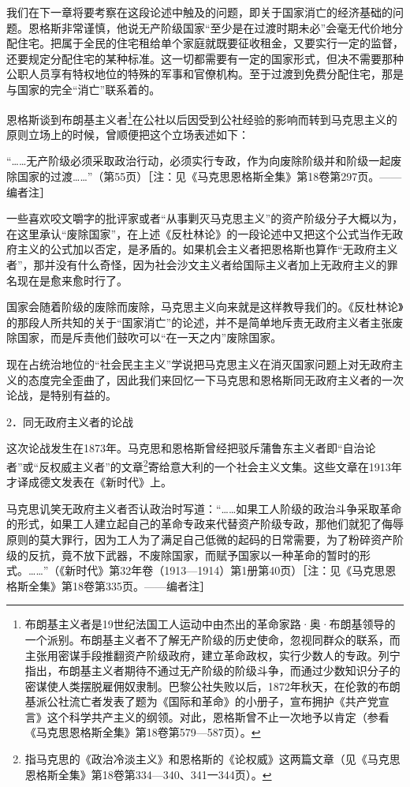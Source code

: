 \documentclass[UTF8, 12pt, a4paper]{ctexrep}
\begin{document}
我们在下一章将要考察在这段论述中触及的问题，即关于国家消亡的经济基础的问题。恩格斯非常谨慎，他说无产阶级国家“至少是在过渡时期未必”会毫无代价地分配住宅。把属于全民的住宅租给单个家庭就既要征收租金，又要实行一定的监督，还要规定分配住宅的某种标准。这一切都需要有一定的国家形式，但决不需要那种公职人员享有特权地位的特殊的军事和官僚机构。至于过渡到免费分配住宅，那是与国家的完全“消亡”联系着的。

恩格斯谈到布朗基主义者\footnote{布朗基主义者是19世纪法国工人运动中由杰出的革命家路·奥·布朗基领导的一个派别。布朗基主义者不了解无产阶级的历史使命，忽视同群众的联系，而主张用密谋手段推翻资产阶级政府，建立革命政权，实行少数人的专政。列宁指出，布朗基主义者期待不通过无产阶级的阶级斗争，而通过少数知识分子的密谋使人类摆脱雇佣奴隶制。巴黎公社失败以后，1872年秋天，在伦敦的布朗基派公社流亡者发表了题为《国际和革命》的小册子，宣布拥护《共产党宣言》这个科学共产主义的纲领。对此，恩格斯曾不止一次地予以肯定（参看《马克思恩格斯全集》第18卷第579—587页）。}在公社以后因受到公社经验的影响而转到马克思主义的原则立场上的时候，曾顺便把这个立场表述如下：

“……无产阶级必须采取政治行动，必须实行专政，作为向废除阶级并和阶级一起废除国家的过渡……”（第55页）［注：见《马克思恩格斯全集》第18卷第297页。——编者注］

一些喜欢咬文嚼字的批评家或者“从事剿灭马克思主义”的资产阶级分子大概以为，在这里承认“废除国家”，在上述《反杜林论》的一段论述中又把这个公式当作无政府主义的公式加以否定，是矛盾的。如果机会主义者把恩格斯也算作“无政府主义者”，那并没有什么奇怪，因为社会沙文主义者给国际主义者加上无政府主义的罪名现在是愈来愈时行了。

国家会随着阶级的废除而废除，马克思主义向来就是这样教导我们的。《反杜林论》的那段人所共知的关于“国家消亡”的论述，并不是简单地斥责无政府主义者主张废除国家，而是斥责他们鼓吹可以“在一天之内”废除国家。

现在占统治地位的“社会民主主义”学说把马克思主义在消灭国家问题上对无政府主义的态度完全歪曲了，因此我们来回忆一下马克思和恩格斯同无政府主义者的一次论战，是特别有益的。

2．同无政府主义者的论战

这次论战发生在1873年。马克思和恩格斯曾经把驳斥蒲鲁东主义者即“自治论者”或“反权威主义者”的文章\footnote{指马克思的《政治冷淡主义》和恩格斯的《论权威》这两篇文章（见《马克思恩格斯全集》第18卷第334—340、341一344页）。}寄给意大利的一个社会主义文集。这些文章在1913年才译成德文发表在《新时代》上。

马克思讥笑无政府主义者否认政治时写道：“……如果工人阶级的政治斗争采取革命的形式，如果工人建立起自己的革命专政来代替资产阶级专政，那他们就犯了侮辱原则的莫大罪行，因为工人为了满足自己低微的起码的日常需要，为了粉碎资产阶级的反抗，竟不放下武器，不废除国家，而赋予国家以一种革命的暂时的形式。……”（《新时代》第32年卷（1913—1914）第1册第40页）［注：见《马克思恩格斯全集》第18卷第335页。——编者注］
\end{document}
